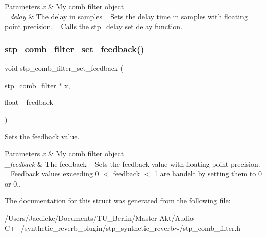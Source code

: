 \begin{DoxyParams}{Parameters}
{\em x} & My comb filter object ~\newline
 \\
\hline
{\em \+\_\+delay} & The delay in samples ~\newline
 Sets the delay time in samples with floating point precision. ~\newline
 Calls the \hyperlink{structstp__delay}{stp\+\_\+delay} set delay function. ~\newline
 \\
\hline
\end{DoxyParams}
\mbox{\label{structstp__comb__filter_a552185fbb2f8236961c25ed67ed62033}} 
\subsubsection{\texorpdfstring{stp\+\_\+comb\+\_\+filter\+\_\+set\+\_\+feedback()}{stp\_comb\_filter\_set\_feedback()}}
{\footnotesize\ttfamily void stp\+\_\+comb\+\_\+filter\+\_\+set\+\_\+feedback (\begin{DoxyParamCaption}\item[{\hyperlink{structstp__comb__filter}{stp\+\_\+comb\+\_\+filter} $\ast$}]{x,  }\item[{float}]{\+\_\+feedback }\end{DoxyParamCaption})\hspace{0.3cm}{\ttfamily [related]}}



Sets the feedback value. ~\newline
 


\begin{DoxyParams}{Parameters}
{\em x} & My comb filter object ~\newline
 \\
\hline
{\em \+\_\+feedback} & The feedback ~\newline
 Sets the feedback value with floating point precision. ~\newline
 Feedback values exceeding 0 $<$ feedback $<$ 1 are handelt by setting them to 0 or 0.. ~\newline
 \\
\hline
\end{DoxyParams}


The documentation for this struct was generated from the following file\+:\begin{DoxyCompactItemize}
\item 
/\+Users/\+Jaedicke/\+Documents/\+T\+U\+\_\+\+Berlin/\+Master Akt/\+Audio C++/synthetic\+\_\+reverb\+\_\+plugin/stp\+\_\+synthetic\+\_\+reverb$\sim$/stp\+\_\+comb\+\_\+filter.\+h\end{DoxyCompactItemize}

